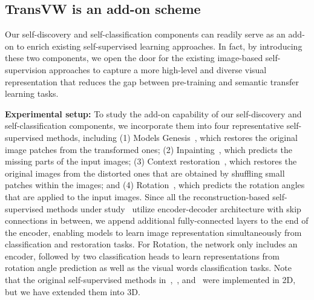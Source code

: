 \documentclass[journal,twoside,web]{ieeecolor}
\begin{document}
\subsection{ TransVW is an add-on scheme}
\label{sec:results_addon}
  

Our self-discovery  and  self-classification components can readily serve as an add-on to enrich existing self-supervised learning approaches. In fact, by  introducing  these two components,  we open the door for the existing image-based self-supervision approaches
to capture a more high-level and diverse visual representation
that reduces the gap between pre-training and semantic transfer learning tasks.

\smallskip
\noindent\textbf{Experimental setup:} To study the add-on capability of our self-discovery and self-classification components, we incorporate them into four representative self-supervised  methods, including  (1) Models Genesis~\cite{zhou2019models}, which restores the original image patches from the transformed ones; (2) Inpainting~\cite{pathak2016context}, which predicts the missing parts of the  input images; (3) Context restoration~\cite{chen2019self}, which restores the original images from the distorted ones that are obtained by shuffling small patches within the images; and (4) Rotation~\cite{gidaris2018unsupervised}, which predicts the rotation angles that are applied to the input images.
Since all the reconstruction-based self-supervised methods under study~\cite{zhou2019models,pathak2016context,chen2019self} utilize encoder-decoder architecture with skip connections in between, we append additional fully-connected layers to the end of the encoder, enabling models to learn image representation simultaneously from  classification and restoration tasks. 
For Rotation, the network only includes an encoder, followed by two classification heads to learn representations from rotation angle prediction as well as the visual words classification tasks. 
Note that the original self-supervised methods in~\cite{gidaris2018unsupervised},~\cite{pathak2016context}, and~\cite{chen2019self} were implemented in 2D, but we have extended them into 3D.
\end{document}
